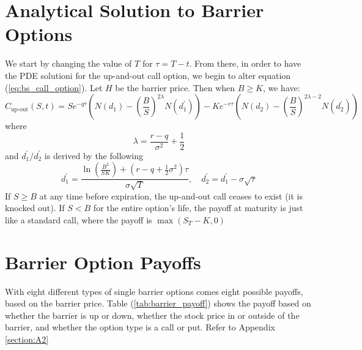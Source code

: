 \section{Analytical Solution to Barrier Options}

We start by changing the value of $T$ for $\tau=T-t$. From there, in order to have the PDE solutioni for the up-and-out call option, we begin to alter equation (\ref{eq:bs_call_option}). Let $H$ be the barrier price. Then when $B\geq K$, we have:
\begin{equation}\label{eq:DOC}
	C_{\text{up-out}}(S,t)=Se^{-q\tau}\left(N(d_1)-\left(\frac{B}{S}\right)^{2\lambda}N(d^\prime_1)\right)-Ke^{-r\tau}\left(N(d_2)-\left(\frac{B}{S}\right)^{2\lambda-2} N(d^\prime_2)\right)
\end{equation}
where
\begin{equation}
	\lambda=\frac{r-q}{\sigma^2}+\frac{1}{2}
\end{equation}
and $d^\prime_1/d^\prime_2$ is derived by the following
\begin{equation}
	d^\prime_1=\frac{\ln\left(\frac{B^2}{SK}\right)+(r-q+\tfrac{1}{2}\sigma^2)\tau}{\sigma\sqrt{T}},\quad d^\prime_2=d^\prime_1-\sigma\sqrt{\tau}
\end{equation}
If $S\geq B$ at any time before expiration, the up-and-out call ceases to exist (it is knocked out). If $S<B$ for the entire option's life, the payoff at maturity is just like a standard call, where the payoff is $\max\left(S_T-K, 0\right)$

\section{Barrier Option Payoffs}

With eight different types of single barrier options comes eight possible payoffs, based on the barrier price. Table (\ref{tab:barrier_payoff}) shows the payoff based on whether the barrier is up or down, whether the stock price in or outside of the barrier, and whether the option type is a call or put. Refer to Appendix \ref{section:A2}

